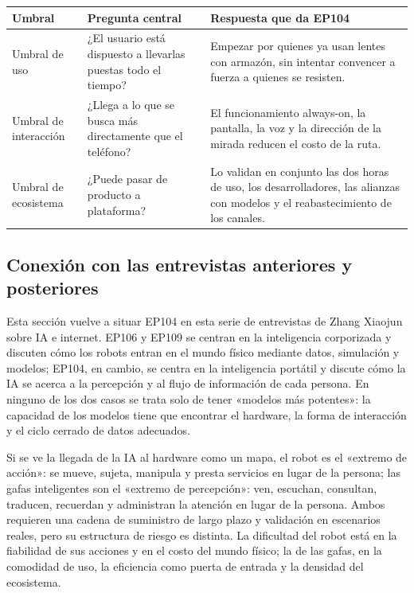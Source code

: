\documentclass[a4paper]{article}
\begin{document}
\noindent\begin{tabularx}{\textwidth}{p{}p{}X}
\toprule
Umbral & Pregunta central & Respuesta que da EP104 \\
\midrule
Umbral de uso & ¿El usuario está dispuesto a llevarlas puestas todo el tiempo? & Empezar por quienes ya usan lentes con armazón, sin intentar convencer a fuerza a quienes se resisten. \\
Umbral de interacción & ¿Llega a lo que se busca más directamente que el teléfono? & El funcionamiento always-on, la pantalla, la voz y la dirección de la mirada reducen el costo de la ruta. \\
Umbral de ecosistema & ¿Puede pasar de producto a plataforma? & Lo validan en conjunto las dos horas de uso, los desarrolladores, las alianzas con modelos y el reabastecimiento de los canales. \\
\bottomrule
\end{tabularx}

\subsection{Conexión con las entrevistas anteriores y posteriores}

Esta sección vuelve a situar EP104 en esta serie de entrevistas de Zhang Xiaojun sobre IA e internet. EP106 y EP109 se centran en la inteligencia corporizada y discuten cómo los robots entran en el mundo físico mediante datos, simulación y modelos; EP104, en cambio, se centra en la inteligencia portátil y discute cómo la IA se acerca a la percepción y al flujo de información de cada persona. En ninguno de los dos casos se trata solo de tener «modelos más potentes»: la capacidad de los modelos tiene que encontrar el hardware, la forma de interacción y el ciclo cerrado de datos adecuados.

Si se ve la llegada de la IA al hardware como un mapa, el robot es el «extremo de acción»: se mueve, sujeta, manipula y presta servicios en lugar de la persona; las gafas inteligentes son el «extremo de percepción»: ven, escuchan, consultan, traducen, recuerdan y administran la atención en lugar de la persona. Ambos requieren una cadena de suministro de largo plazo y validación en escenarios reales, pero su estructura de riesgo es distinta. La dificultad del robot está en la fiabilidad de sus acciones y en el costo del mundo físico; la de las gafas, en la comodidad de uso, la eficiencia como puerta de entrada y la densidad del ecosistema.
\end{document}
